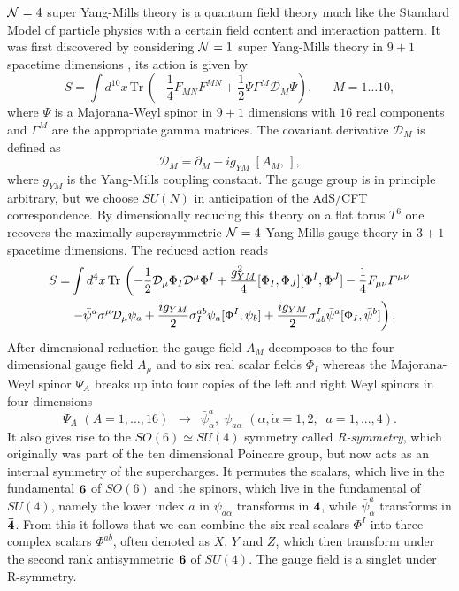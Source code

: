 $\mathcal{N}=4$ super Yang-Mills theory is a quantum field theory much like the Standard Model of particle physics with a certain field content and interaction pattern.
It was first discovered by considering $\mathcal{N}=1$ super Yang-Mills theory in $9+1$ spacetime dimensions \cite{Brink:1977}, its action is given by
\begin{equation}
	S = \int d^{10} x \, \mathrm{Tr} \, \left( -\frac{1}{4}  F_{MN} F^{MN}  + \frac{1}{2} \bar{\Psi} \Gamma^M \mathcal{D}_M \Psi \right), \; \quad \; M = 1 \dots 10,
\end{equation}
where $\Psi$ is a Majorana-Weyl spinor in $9+1$ dimensions with $16$ real components and $\Gamma^M$ are the appropriate gamma matrices. 
The covariant derivative $\mathcal{D}_M$ is defined as
\begin{equation}
	\mathcal{D}_M = \partial_M - ig_{YM} \; [A_M, \, ],
\end{equation}
where $g_{YM}$ is the Yang-Mills coupling constant. 
The gauge group is in principle arbitrary, but we choose $SU(N)$ in anticipation of the AdS/CFT correspondence. 
By dimensionally reducing this theory on a flat torus $T^6$ one recovers the maximally supersymmetric $\mathcal{N}=4$ Yang-Mills gauge theory in $3+1$ spacetime dimensions.
The reduced action reads
\begin{equation}
\begin{split}
S = & \int d^4 x \, \mathrm{Tr} \, \left( -\frac{1}{2} \mathcal{D}_\mu \Phi_I \mathcal{D}^\mu \Phi^I  + \frac{g_{YM}^2}{4} [\Phi_I, \Phi_J] [\Phi^I, \Phi^J] - \frac{1}{4}  F_{\mu\nu} F^{\mu\nu}  \right. \\
	 &\left. - \bar{\psi}^a \sigma^\mu \mathcal{D}_\mu \psi_a  + \frac{ig_{YM}}{2} \sigma^{ab}_I \psi_a [\Phi^I, \psi_b] + \frac{ig_{YM}}{2} \sigma_{ab}^I \bar{\psi}^a [\Phi_I, \bar{\psi}^b] \right).
\end{split}
\label{eq:n4_action}
\end{equation}
After dimensional reduction the gauge field $A_M$ decomposes to the four dimensional gauge field $A_\mu$ and to six real scalar fields $\Phi_I$ whereas the Majorana-Weyl spinor $\Psi_A$ breaks up into four copies of the left and right Weyl spinors in four dimensions 
\begin{equation}
	\Psi_A \, \, (A = 1, ..., 16) \, \, \, \rightarrow \, \, \,  \bar{\psi}^a_{\dot{\alpha}}, \; \psi_{a\alpha} \, \, (\alpha, \dot{\alpha} = 1, 2, \; \; a = 1, ..., 4).
\end{equation}
It also gives rise to the $SO(6) \simeq SU(4)$ symmetry called \emph{R-symmetry}, which originally was part of the ten dimensional Poincare group, but now acts as an internal symmetry of the supercharges.
It permutes the scalars, which live in the fundamental ${\bf 6}$ of $SO(6)$ and the spinors, which live in the fundamental of $SU(4)$, namely the lower index $a$ in $\psi_{a\alpha}$ transforms in ${\bf 4}$, while $\bar{\psi}_{\dot{\alpha}}^a$ transforms in ${\bf \bar{4}}$. 
From this it follows that we can combine the six real scalars $\Phi^I$ into three complex scalars $\Phi^{ab}$, often denoted as $X$, $Y$ and $Z$, which then transform under the second rank antisymmetric ${\bf 6}$ of $SU(4)$. 
The gauge field is a singlet under R-symmetry.

